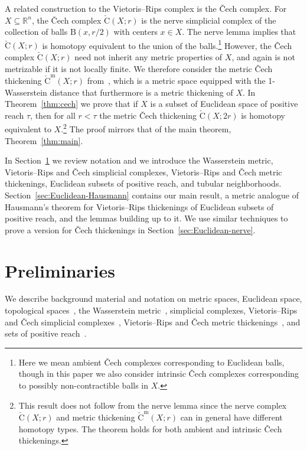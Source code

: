 \documentclass{amsart}
\theoremstyle{plain}
\theoremstyle{definition}
\theoremstyle{myremark}
\newcommand{\R}{\mathbb{R}}
\newcommand{\ball}[2]{\mathrm{B}(#1,#2)}
\newcommand{\cech}[2]{\mathrm{\check{C}}(#1;#2)}
\newcommand{\cechm}[2]{\mathrm{\check{C}^m}(#1;#2)}
\begin{document}
A related construction to the Vietoris--Rips complex is the \v{C}ech complex.
For $X\subseteq\R^n$, the \v{C}ech complex $\cech{X}{r}$ is the nerve simplicial complex of the collection of balls $\ball{x}{r/2}$ with centers $x\in X$. 
The nerve lemma implies that $\cech{X}{r}$ is homotopy equivalent to the union of the balls.\footnote{Here we mean ambient \v{C}ech complexes corresponding to Euclidean balls, though in this paper we also consider intrinsic \v{C}ech complexes corresponding to possibly non-contractible balls in $X$.}
However, the \v{C}ech complex $\cech{X}{r}$ need not inherit any metric properties of $X$, and again is not metrizable if it is not locally finite.
We therefore consider the metric \v{C}ech thickening $\cechm{X}{r}$ from~\cite{MetricReconstructionViaOptimalTransport}, which is a metric space equipped with the 1-Wasserstein distance that furthermore is a metric thickening of $X$.
In Theorem~\ref{thm:cech} we prove that if $X$ is a subset of Euclidean space of positive reach $\tau$, then for all $r<\tau$ the metric \v{C}ech thickening $\cech{X}{2r}$ is homotopy equivalent to $X$.\footnote{This result does not follow from the nerve lemma since the nerve complex $\cech{X}{r}$ and metric thickening $\cechm{X}{r}$ can in general have different homotopy types. The theorem holds for both ambient and intrinsic \v{C}ech thickenings.}
The proof mirrors that of the main theorem, Theorem~\ref{thm:main}.

In Section~\ref{sec:prelims} we review notation and we introduce the Wasserstein metric, Vietoris--Rips and \v{C}ech simplicial complexes, Vietoris--Rips and \v{C}ech metric thickenings, Euclidean subsets of positive reach, and tubular neighborhoods.
Section~\ref{sec:Euclidean-Hausmann} contains our main result, a metric analogue of Hausmann's theorem for Vietoris--Rips thickenings of Euclidean subsets of positive reach, and the lemmas building up to it.
We use similar techniques to prove a version for \v{C}ech thickenings in Section~\ref{sec:Euclidean-nerve}.

\section{Preliminaries}\label{sec:prelims}

We describe background material and notation on metric spaces, Euclidean space, topological spaces~\cite{hatcher2002algebraic}, the Wasserstein metric~\cite{vershik2013long,edwards2011kantorovich}, simplicial complexes, Vietoris--Rips and \v{C}ech simplicial complexes~\cite{EdelsbrunnerHarer}, Vietoris--Rips and \v{C}ech metric thickenings~\cite{MetricReconstructionViaOptimalTransport}, and sets of positive reach~\cite{FedererCurvature}.
\end{document}
